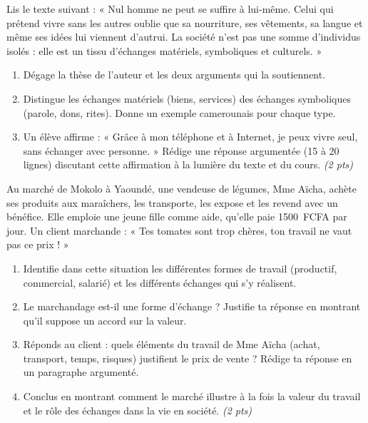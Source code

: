 \documentclass[11pt]{article}
\begin{document}
\begin{exercice}
Lis le texte suivant : « Nul homme ne peut se suffire à lui-même. Celui qui prétend vivre sans les autres oublie que sa nourriture, ses vêtements, sa langue et même ses idées lui viennent d'autrui. La société n'est pas une somme d'individus isolés : elle est un tissu d'échanges matériels, symboliques et culturels. »
\begin{enumerate}
\item Dégage la thèse de l'auteur et les deux arguments qui la soutiennent.
\item Distingue les échanges matériels (biens, services) des échanges symboliques (parole, dons, rites). Donne un exemple camerounais pour chaque type.
\item Un élève affirme : « Grâce à mon téléphone et à Internet, je peux vivre seul, sans échanger avec personne. » Rédige une réponse argumentée (15 à 20 lignes) discutant cette affirmation à la lumière du texte et du cours. \textit{(2 pts)}
\end{enumerate}
\end{exercice}

\begin{exercice}
Au marché de Mokolo à Yaoundé, une vendeuse de légumes, Mme Aïcha, achète ses produits aux maraîchers, les transporte, les expose et les revend avec un bénéfice. Elle emploie une jeune fille comme aide, qu'elle paie \SI{1500}{FCFA} par jour. Un client marchande : « Tes tomates sont trop chères, ton travail ne vaut pas ce prix ! »
\begin{enumerate}
\item Identifie dans cette situation les différentes formes de travail (productif, commercial, salarié) et les différents échanges qui s'y réalisent.
\item Le marchandage est-il une forme d'échange ? Justifie ta réponse en montrant qu'il suppose un accord sur la valeur.
\item Réponds au client : quels éléments du travail de Mme Aïcha (achat, transport, temps, risques) justifient le prix de vente ? Rédige ta réponse en un paragraphe argumenté.
\item Conclus en montrant comment le marché illustre à la fois la valeur du travail et le rôle des échanges dans la vie en société. \textit{(2 pts)}
\end{enumerate}
\end{exercice}
\end{document}

